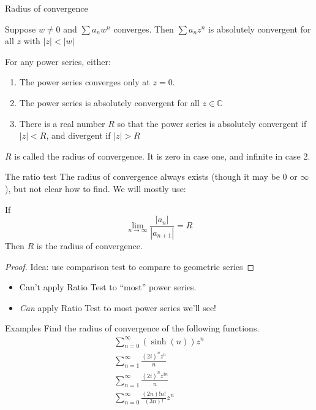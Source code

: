 \documentclass{beamer}
\newcommand{\C}{\mathbb{C}}
\begin{document}
\begin{frame}{Radius of convergence}
\begin{theorem} Suppose $w\neq 0$ and $\sum a_n w^n$ converges.  Then $\sum a_n z^n$ is absolutely convergent for all $z$ with $|z|<|w|$
\end{theorem}
\begin{theorem}[Abel]
For any power series, either:
\begin{enumerate}
\item The power series converges only at $z=0$.
\item The power series is absolutely convergent for all $z\in\C$
\item There is a real number $R$ so that the power series is absolutely convergent if $|z|<R$, and divergent if $|z|>R$
\end{enumerate}
\end{theorem}
$R$ is called the radius of convergence. It is zero in case one, and infinite in case 2.

\end{frame}

\begin{frame}{The ratio test}
The radius of convergence always exists (though it may be 0 or $\infty$), but not clear how to find.  We will mostly use:
\begin{theorem} If
$$\lim_{n\to\infty} \frac{|a_n|}{|a_{n+1}|}=R$$
Then $R$ is the radius of convergence.
\end{theorem}
\begin{proof} 
Idea: use comparison test to compare to geometric series
\end{proof}
\begin{itemize}
    \item  \alert{Can't} apply Ratio Test to ``most'' power series. \\
\item \emph{Can} apply Ratio Test to most power series we'll see!
\end{itemize}

\end{frame}




\begin{frame}{Examples}
Find the radius of convergence of the following functions.
\begin{eqnarray}
\sum_{n=0}^\infty (\sinh(n))z^n \\
\sum_{n=1}^\infty \frac{(2i)^nz^n}{n} \\
\sum_{n=1}^\infty \frac{(2i)^nz^{3n}}{n} \\
\sum_{n=0}^\infty \frac{(2n)!n!}{(3n)!} z^n
\end{eqnarray}
    
    


\end{frame}
\end{document}
